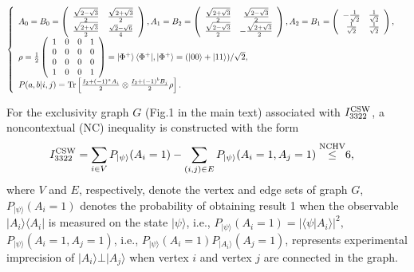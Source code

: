 \documentclass[pra,aps,notitlepage,superscriptaddress,showpacs,showkeys]{revtex4-1}
\theoremstyle{definition}
\theoremstyle{remark}
\begin{document}
\begin{eqnarray}
\left\{
  \begin{array}{ll}
    A_0=B_0=\left(
          \begin{array}{cc}
            \frac{\sqrt{2-\sqrt{3}}}{2} & \frac{\sqrt{2+\sqrt{3}}}{2} \\
            \frac{\sqrt{2+\sqrt{3}}}{2} & \frac{\sqrt{2}-\sqrt{6}}{4} \\
          \end{array}
        \right),
    A_1=B_2=\left(
          \begin{array}{cc}
            \frac{\sqrt{2+\sqrt{3}}}{2} & \frac{\sqrt{2-\sqrt{3}}}{2} \\
            \frac{\sqrt{2-\sqrt{3}}}{2} & -\frac{\sqrt{2+\sqrt{3}}}{2} \\
          \end{array}
        \right),
    A_2=B_1=\left(
          \begin{array}{cc}
            -\frac{1}{\sqrt{2}} & \frac{1}{\sqrt{2}} \\
            \frac{1}{\sqrt{2}} & \frac{1}{\sqrt{2}} \\
          \end{array}
        \right), & \\
\rho=\frac{1}{2}\left(
       \begin{array}{cccc}
        1 & 0 & 0 & 1 \\
         0 & 0 & 0 & 0 \\
         0 & 0 & 0 & 0 \\
         1 & 0 & 0 & 1 \\
       \end{array}
     \right)=\ket{\Phi^+}\langle\Phi^+|
,\ket{\Phi^+}=(|00\rangle+|11\rangle)/\sqrt{2}, &\\
P(a,b|i,j)={\rm{Tr}}\left[\frac{I_2+(-1)^aA_i}{2}\otimes \frac{I_2+(-1)^bB_j}{2}\rho\right]. &
  \end{array}
\right.
\end{eqnarray}



For the exclusivity graph $G$ (Fig.1 in the main text) associated with $I_{3322}^{\rm CSW}$,
a noncontextual (NC) inequality is constructed with the form
\begin{eqnarray}
I_{3322}^{\rm CSW}
=\sum_{i\in V}P_{|\psi\rangle}(A_i=1)-\sum_{(i,j)\in E}P_{|\psi\rangle}(A_i=1,A_j=1)\overset{{\rm{NCHV}}}\leq& 6,
\label{I3322QC}
\end{eqnarray}
where $V$ and $E$, respectively, denote the vertex and edge sets of graph $G$,
$P_{|\psi\rangle}(A_i=1)$ denotes the probability of obtaining result 1 when the observable $|A_i\rangle\langle A_i|$ is measured on the state $|\psi\rangle $,  i.e., $P_{|\psi\rangle}(A_i=1)= |\langle \psi|A_i\rangle|^2,$ $P_{|\psi\rangle}(A_i=1,A_j=1)$, i.e.,  $P_{|\psi\rangle}(A_i=1)P_{|A_i\rangle}(A_j=1)$, represents experimental imprecision of $|A_i\rangle\bot |A_j\rangle$ when vertex $i$ and vertex $j$ are connected in the graph.
\end{document}
